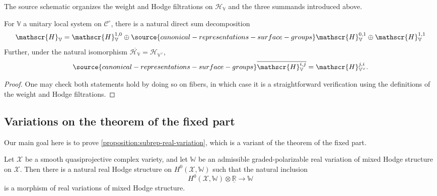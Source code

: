 \begin{remark}
\label{figure:Hodge-diagram}
The source schematic organizes the weight and Hodge filtrations on
$\mathscr{H}_{\mathbb V}$ and the three summands introduced above.
\end{remark}
%

\begin{lemma}
\notready
	\label{lemma:three-part-hodge-structure}
	For $\mathbb V$ a unitary local system on $\mathscr C^\circ$, there is a natural
	direct sum decomposition
\begin{equation}
\label{eqn:hodge-decomposition-cpx}\mathscr{H}_\mathbb{V}=\mathscr{H}_{\mathbb{V}}^{1,0}\oplus
\source{canonical-representations-surface-groups}
\mathscr{H}_{\mathbb{V}}^{0,1}\oplus
\mathscr{H}_{\mathbb{V}}^{1,1}\end{equation}
Further, under the natural isomorphism
$\overline{\mathscr{H}_\mathbb{V}}=\mathscr{H}_{\mathbb{V}^\vee}$,
\begin{align}
	\label{equation:dual-conjugate}
\source{canonical-representations-surface-groups}
\overline{\mathscr{H}_{\mathbb{V}}^{i,j}}=\mathscr{H}_{\mathbb{V}^\vee}^{j,i}.
\end{align}
\end{lemma}
\begin{proof}
	One may check both statements hold
	by doing so on fibers, in which case it is a straightforward
	verification using the definitions of the weight and Hodge filtrations.
\end{proof}

\subsection{Variations on the theorem of the fixed part}
\label{subsection:fixed-part}

Our main goal here is to prove
\autoref{proposition:subrep-real-variation}, which is a variant of the theorem of the fixed part.
\begin{theorem}
\notready\label{theorem:theorem-of-the-fixed-part}
	Let $\mathscr{X}$ be a smooth quasiprojective complex variety, and let $\mathbb{W}$ be an admissible graded-polarizable real variation of mixed Hodge structure on $\mathscr{X}$. Then there is a natural real Hodge structure on $H^0(\mathscr{X}, \mathbb{W})$ such that the natural inclusion $$H^0(\mathscr{X}, \mathbb{W})\otimes \underline{\mathbb{R}}\to \mathbb{W}$$ is a morphism of real variations of mixed Hodge structure.
\end{theorem}

